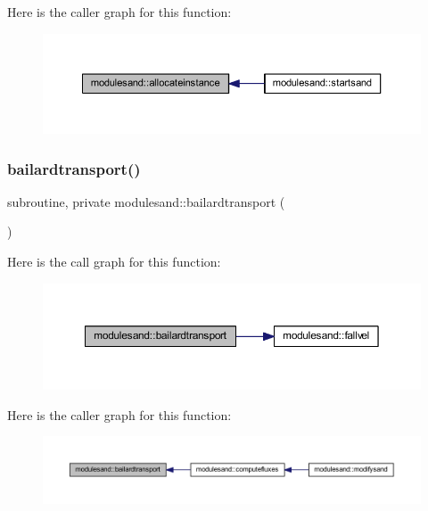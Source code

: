Here is the caller graph for this function\+:\nopagebreak
\begin{figure}[H]
\begin{center}
\leavevmode
\includegraphics[width=350pt]{namespacemodulesand_ad161b287427b9612e9e73f0e7cb2b2ec_icgraph}
\end{center}
\end{figure}
\mbox{\label{namespacemodulesand_a93c84a69d793110411e83cb30859f0e3}} 
\subsubsection{\texorpdfstring{bailardtransport()}{bailardtransport()}}
{\footnotesize\ttfamily subroutine, private modulesand\+::bailardtransport (\begin{DoxyParamCaption}{ }\end{DoxyParamCaption})\hspace{0.3cm}{\ttfamily [private]}}

Here is the call graph for this function\+:\nopagebreak
\begin{figure}[H]
\begin{center}
\leavevmode
\includegraphics[width=350pt]{namespacemodulesand_a93c84a69d793110411e83cb30859f0e3_cgraph}
\end{center}
\end{figure}
Here is the caller graph for this function\+:\nopagebreak
\begin{figure}[H]
\begin{center}
\leavevmode
\includegraphics[width=350pt]{namespacemodulesand_a93c84a69d793110411e83cb30859f0e3_icgraph}
\end{center}
\end{figure}
\mbox{\label{namespacemodulesand_ae86fef0e135985c199efb346e08b85dc}} 
